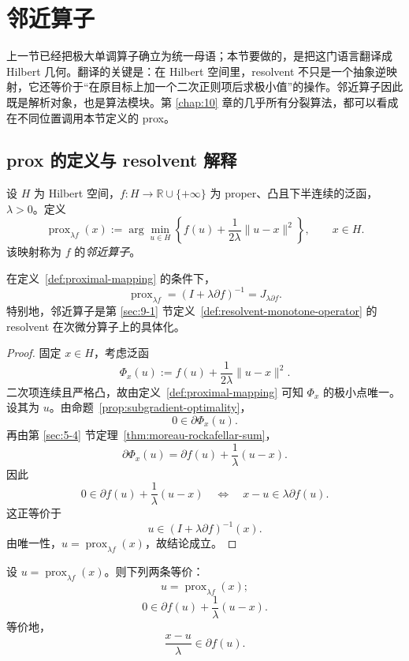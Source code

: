 \section{邻近算子}

\label{sec:9-2}

上一节已经把极大单调算子确立为统一母语；本节要做的，是把这门语言翻译成 Hilbert 几何。翻译的关键是：在 Hilbert 空间里，resolvent 不只是一个抽象逆映射，它还等价于“在原目标上加一个二次正则项后求极小值”的操作。邻近算子因此既是解析对象，也是算法模块。第 \ref{chap:10} 章的几乎所有分裂算法，都可以看成在不同位置调用本节定义的 prox。

\subsection{prox 的定义与 resolvent 解释}

\begin{definition}[邻近算子]\label{def:proximal-mapping}
设 $H$ 为 Hilbert 空间，$f\colon H\to \mathbb R\cup\{+\infty\}$ 为 proper、凸且下半连续的泛函，$\lambda>0$。定义
\[
\operatorname{prox}_{\lambda f}(x)
:=
\arg\min_{u\in H}
\left\{
f(u)+\frac{1}{2\lambda}\|u-x\|^2
\right\},
\qquad x\in H.
\]
该映射称为 $f$ 的\emph{邻近算子}。
\end{definition}

\begin{proposition}\label{prop:prox-resolvent-subdifferential}
在定义~\ref{def:proximal-mapping} 的条件下，
\[
\operatorname{prox}_{\lambda f}=(I+\lambda \partial f)^{-1}=J_{\lambda\partial f}.
\]
特别地，邻近算子是第 \ref{sec:9-1} 节定义~\ref{def:resolvent-monotone-operator} 的 resolvent 在次微分算子上的具体化。
\end{proposition}

\begin{proof}
固定 $x\in H$，考虑泛函
\[
\Phi_x(u):=f(u)+\frac{1}{2\lambda}\|u-x\|^2.
\]
二次项连续且严格凸，故由定义~\ref{def:proximal-mapping} 可知 $\Phi_x$ 的极小点唯一。设其为 $u$。由命题~\ref{prop:subgradient-optimality}，
\[
0\in \partial \Phi_x(u).
\]
再由第 \ref{sec:5-4} 节定理~\ref{thm:moreau-rockafellar-sum}，
\[
\partial \Phi_x(u)=\partial f(u)+\frac{1}{\lambda}(u-x).
\]
因此
\[
0\in \partial f(u)+\frac{1}{\lambda}(u-x)
\quad\Longleftrightarrow\quad
x-u\in \lambda \partial f(u).
\]
这正等价于
\[
u\in (I+\lambda\partial f)^{-1}(x).
\]
由唯一性，$u=\operatorname{prox}_{\lambda f}(x)$，故结论成立。
\end{proof}

\begin{proposition}\label{prop:prox-optimality-condition}
设 $u=\operatorname{prox}_{\lambda f}(x)$。则下列两条等价：
\[
u=\operatorname{prox}_{\lambda f}(x);
\]
\[
0\in \partial f(u)+\frac{1}{\lambda}(u-x).
\]
等价地，
\[
\frac{x-u}{\lambda}\in \partial f(u).
\]
\end{proposition}

